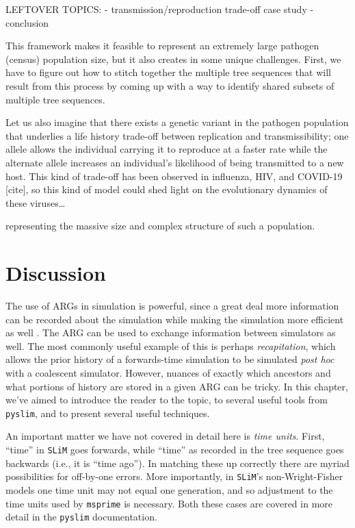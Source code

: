 \documentclass[12pt]{article}
\newcommand{\msprime}[0]{\texttt{msprime}\xspace}
\newcommand{\slim}[0]{\texttt{SLiM}\xspace}
\newcommand{\pyslim}[0]{\texttt{pyslim}\xspace}
\begin{document}

LEFTOVER TOPICS:
- transmission/reproduction trade-off case study
- conclusion

This framework makes it feasible to represent an extremely large pathogen (census) population size, but it also
creates in some unique challenges. First, we have to figure out how to stitch together the multiple tree sequences
that will result from this process by coming up with a way to identify shared subsets of multiple tree sequences.

Let us also imagine that there exists a genetic variant in the pathogen population that underlies a life history trade-off between replication and transmissibility; one allele allows the individual carrying it to reproduce at a faster rate while the alternate allele increases an individual's likelihood of being transmitted to a new host. This kind of trade-off has been observed in influenza, HIV, and COVID-19 [cite], so this kind of model could shed light on the evolutionary dynamics of these viruses…

representing the massive size and complex structure of such a population.

\section*{Discussion}

The use of ARGs in simulation is powerful,
since a great deal more information can be recorded about the simulation
while making the simulation more efficient as well \citep{kelleher2016efficient}.
The ARG can be used to exchange information between simulators as well.
The most commonly useful example of this is perhaps \emph{recapitation},
which allows the prior history of a forwards-time simulation
to be simulated \emph{post hoc} with a coalescent simulator.
However, nuances of exactly which ancestors and what portions of history
are stored in a given ARG can be tricky.
In this chapter, we've aimed to introduce the reader to the topic,
to several useful tools from \pyslim,
and to present several useful techniques.

An important matter we have not covered in detail here is \emph{time units}.
First, ``time'' in \slim goes forwards, while ``time'' as recorded in the tree sequence goes backwards (i.e., it is ``time ago'').
In matching these up correctly there are myriad possibilities for off-by-one errors.
More importantly, in \slim's non-Wright-Fisher models one time unit may not equal one generation,
and so adjustment to the time units used by \msprime is necessary.
Both these cases are covered in more detail in the \pyslim documentation.
\end{document}
